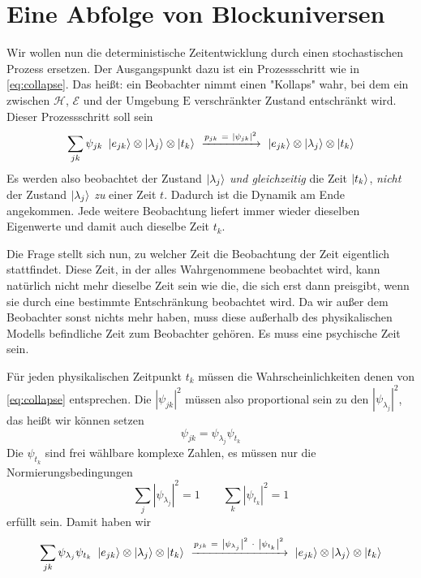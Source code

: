 \documentclass[12pt]{article}
\begin{document}
\section{Eine Abfolge von Blockuniversen}

Wir wollen nun die deterministische Zeitentwicklung durch einen stochastischen Prozess ersetzen. Der Ausgangspunkt dazu ist ein Prozessschritt wie in \eqref{eq:collapse}. Das heißt: ein Beobachter nimmt einen "Kollaps" wahr, bei dem ein zwischen $\mathscr{H}$, $\mathscr{E}$ und der Umgebung $\mathrm{E}$ verschränkter Zustand entschränkt wird. Dieser Prozessschritt soll sein
\begin{equation*} 
\sum_{jk} \psi_{jk}\ \ket{e_{jk}} \otimes \ket{\lambda_j} \otimes \ket{t_k} 
\ \xrightarrow{p_{jk}\ =\ \left|\psi_{jk}\right|^2}\ 
\ket{e_{jk}} \otimes \ket{\lambda_j} \otimes \ket{t_k}
\end{equation*}
Es werden also beobachtet der Zustand $\ket{\lambda_j}$ \emph{und gleichzeitig} die Zeit $\ket{t_k}$, \emph{nicht} der Zustand $\ket{\lambda_j}$ \emph{zu} einer Zeit $t$. Dadurch ist die Dynamik am Ende angekommen. Jede weitere Beobachtung liefert immer wieder dieselben Eigenwerte und damit auch dieselbe Zeit $t_k$. 

Die Frage stellt sich nun, zu welcher Zeit die Beobachtung der Zeit eigentlich stattfindet. Diese Zeit, in der alles Wahrgenommene beobachtet wird, kann natürlich nicht mehr dieselbe Zeit sein wie die, die sich erst dann preisgibt, wenn sie durch eine bestimmte Entschränkung beobachtet wird. Da wir außer dem Beobachter sonst nichts mehr haben, muss diese außerhalb des physikalischen Modells befindliche Zeit zum Beobachter gehören. Es muss eine psychische Zeit sein.

Für jeden physikalischen Zeitpunkt $t_k$ müssen die Wahrscheinlichkeiten denen von \eqref{eq:collapse} entsprechen. Die $\left|\psi_{jk}\right|^2$ müssen also proportional sein zu den $\left|\psi_{\lambda_j}\right|^2$, das heißt wir können setzen
\begin{equation*}
\psi_{jk} =  \psi_{\lambda_j} \psi_{t_k}
\end{equation*}
Die $\psi_{t_k}$ sind frei wählbare komplexe Zahlen, es müssen nur die Normierungsbedingungen
\begin{equation*}
\sum_j \left|\psi_{\lambda_j}\right|^2 = 1 \quad\quad
\sum_{k} \left|\psi_{t_k}\right|^2 = 1
\end{equation*}
erfüllt sein. Damit haben wir 
\begin{equation} 
\label{eq:collapse_with_time}
\sum_{jk} \psi_{\lambda_j}\psi_{t_k} \ \ket{e_{jk}} \otimes \ket{\lambda_j} \otimes \ket{t_k} 
\ \xrightarrow{p_{jk}\ =\ \left|\psi_{\lambda_j}\right|^2\ \cdot\ \left|\psi_{t_k}\right|^2}\ 
\ket{e_{jk}} \otimes \ket{\lambda_j} \otimes \ket{t_k}
\end{equation}
\end{document}
